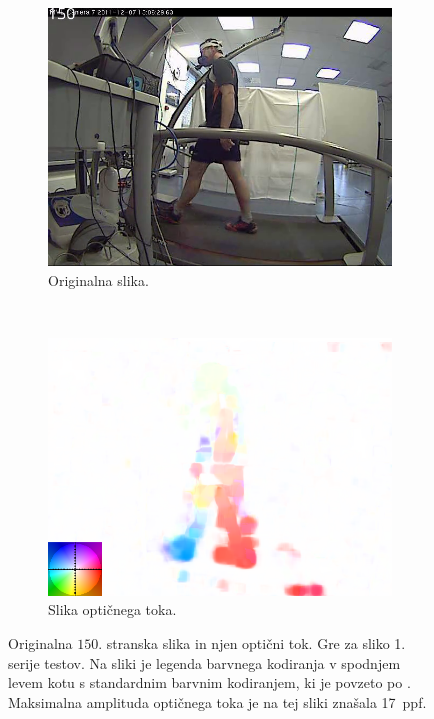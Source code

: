 \begin{figure}[!htb]
	\centering
	\begin{subfigure}{0.45\columnwidth}
		\includegraphics[width=\columnwidth]{./Slike/normal-sv-150.png}
		\caption{Originalna slika.}
	\end{subfigure}
	~
	\begin{subfigure}{0.45\columnwidth}
	    \includegraphics[width=\columnwidth, frame]{./Slike/normal-sv-of-coded-150.png}
		\caption{Slika optičnega toka.}
		\label{fig:stage1-of}
	\end{subfigure}
    \caption[Originalna $150$. stranska slika in optični tok]{Originalna $150$. stranska slika in njen optični tok. Gre za sliko 1. serije testov. Na sliki  je legenda barvnega kodiranja v spodnjem levem kotu s standardnim barvnim kodiranjem, ki je povzeto po \cite{baker2011database}. Maksimalna amplituda optičnega toka je na tej sliki znašala \SI{17}{ppf}.}
    \label{fig:opticni-tok-stage1}
\end{figure}

